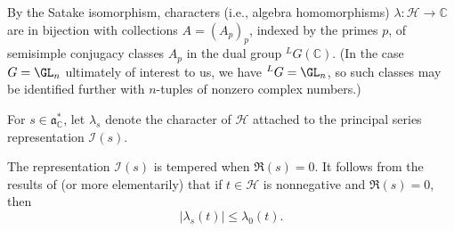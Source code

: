 By the Satake isomorphism, characters (i.e., algebra homomorphisms) $\lambda : \mathcal{H} \rightarrow \mathbb{C}$ are in bijection with collections $A = (A_p)_p$, indexed by the primes $p$, of semisimple conjugacy classes $A_p$ in the dual group ${}^L G(\mathbb{C})$.  (In the case $G = \GL_n$ ultimately of interest to us, we have ${}^L G = \GL_n$, so such classes may be identified further with $n$-tuples of nonzero complex numbers.)

For $s \in \mathfrak{a}_{\mathbb{C}}^*$, let $\lambda_s$ denote the character of $\mathcal{H}$ attached to the principal series representation $\mathcal{I}(s)$.

The representation $\mathcal{I}(s)$ is tempered when $\Re(s) = 0$.  It follows from the results of \cite{MR946351} (or more elementarily) that if $t \in \mathcal{H}$ is nonnegative and $\Re(s) = 0$,  then
\begin{equation}\label{eq:lambd-leq-lambd}
  |\lambda_s(t)| \leq \lambda_0(t).
\end{equation}

